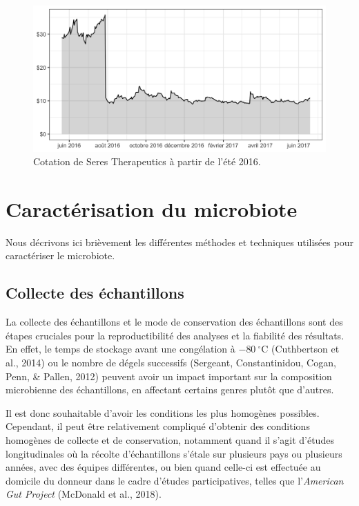 \documentclass[12pt,a4paper]{reedthesis}
\theoremstyle{definition}
\theoremstyle{definition}
\theoremstyle{definition}
\theoremstyle{remark}
\begin{document}
\begin{figure}

{\centering \includegraphics[width=0.9\linewidth]{img/seres} 

}

\caption{Cotation de Seres Therapeutics à partir de l'été 2016.}\label{fig:seres}
\end{figure}
\hypertarget{caracterisation}{%
\section{Caractérisation du microbiote}\label{caracterisation}}

Nous décrivons ici brièvement les différentes méthodes et techniques utilisées pour caractériser le microbiote.

\hypertarget{collecte-des-uxe9chantillons}{%
\subsection{Collecte des échantillons}\label{collecte-des-uxe9chantillons}}

La collecte des échantillons et le mode de conservation des échantillons sont des étapes cruciales pour la reproductibilité des analyses et la fiabilité des résultats. En effet, le temps de stockage avant une congélation à \(-80~^\circ\text{C}\) (Cuthbertson et al., 2014) ou le nombre de dégels successifs (Sergeant, Constantinidou, Cogan, Penn, \& Pallen, 2012) peuvent avoir un impact important sur la composition microbienne des échantillons, en affectant certains genres plutôt que d'autres.

Il est donc souhaitable d'avoir les conditions les plus homogènes possibles. Cependant, il peut être relativement compliqué d'obtenir des conditions homogènes de collecte et de conservation, notamment quand il s'agit d'études longitudinales où la récolte d'échantillons s'étale sur plusieurs pays ou plusieurs années, avec des équipes différentes, ou bien quand celle-ci est effectuée au domicile du donneur dans le cadre d'études participatives, telles que l'\emph{American Gut Project} (McDonald et al., 2018).
\end{document}
